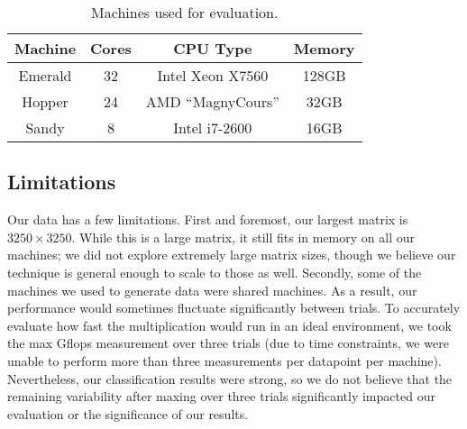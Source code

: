 \begin{table}[t]
    \begin{center}
        \begin{tabular}{c|c|c|c}
            Machine & Cores & CPU Type & Memory \\ \hline
            Emerald & 32 & Intel Xeon X7560 & 128GB \\
            Hopper & 24 & AMD ``MagnyCours'' & 32GB \\
            Sandy & 8 & Intel i7-2600 & 16GB \\
        \end{tabular}
    \end{center}
    \caption{Machines used for evaluation.}
    \label{t:machines}
\end{table}

\subsection{Limitations}
Our data has a few limitations.
First and foremost, our largest matrix is $3250\times{3250}$.
While this is a large matrix, it still fits in memory on all our machines; we did not explore extremely large matrix sizes, though we believe our technique is general enough to scale to those as well.
Secondly, some of the machines we used to generate data were shared machines.
As a result, our performance would sometimes fluctuate significantly between trials.
To accurately evaluate how fast the multiplication would run in an ideal environment, we took the max Gflops measurement over three trials (due to time constraints, we were unable to perform more than three measurements per datapoint per machine).
Nevertheless, our classification results were strong, so we do not believe that the remaining variability after maxing over three trials significantly impacted our evaluation or the significance of our results.
